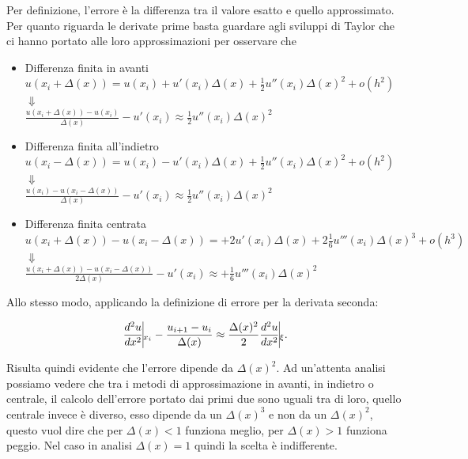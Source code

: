 Per definizione, l'errore è la differenza tra il valore esatto e quello approssimato. Per quanto riguarda le derivate prime basta guardare agli sviluppi di Taylor che ci hanno portato alle loro approssimazioni per osservare che\\
\begin{itemize}
    \item Differenza finita in avanti\\
    \centering
    $u(x_i+\Delta(x))=u(x_i)+u'(x_i)\Delta(x)+\frac{1}{2}u''(x_i)\Delta(x)^2+o(h^2)$ \\ $\Downarrow$\\
    $\frac{u(x_i+\Delta(x))-u(x_i)}{\Delta(x)} -u'(x_i)\approx \frac{1}{2}u''(x_i)\Delta(x)^2$\\
    \raggedright
    \item Differenza finita all'indietro\\
    \centering
    $u(x_i-\Delta(x))=u(x_i)-u'(x_i)\Delta(x)+\frac{1}{2}u''(x_i)\Delta(x)^2+o(h^2)$ \\ $\Downarrow$\\
    $\frac{u(x_i)-u(x_i-\Delta(x))}{\Delta(x)} -u'(x_i)\approx \frac{1}{2}u''(x_i)\Delta(x)^2$\\
    \raggedright
    \item Differenza finita centrata\\
    \centering
    $u(x_i+\Delta(x))-u(x_i-\Delta(x))=+2u'(x_i)\Delta(x)+2\frac{1}{6}u'''(x_i)\Delta(x)^3+o(h^3)$ \\ $\Downarrow$\\
    $\frac{u(x_i+\Delta(x))-u(x_i-\Delta(x))}{2\Delta(x)} -u'(x_i)\approx +\frac{1}{6}u'''(x_i)\Delta(x)^2$\\
    \raggedright
\end{itemize}
\vspace{2em}
Allo stesso modo, applicando la definizione di errore per la derivata seconda:

$$
\frac{d^2u}{dx^2}\vline_{x_i}-\frac{u_{i+1}-u_i}{\Delta(x)}\approx \frac{\Delta(x)^2}{2} \frac{d^2u}{dx^2}\vline_\xi.
$$

Risulta quindi evidente che l'errore dipende da $\Delta(x)^2$. 
Ad un'attenta analisi possiamo vedere che tra i metodi di approssimazione in avanti, in indietro o centrale, il calcolo dell'errore portato dai primi due sono uguali tra di loro, quello centrale invece è diverso, esso dipende da un $\Delta(x)^3$ e non da un $\Delta(x)^2$, questo vuol dire che per $\Delta(x)<1$ funziona meglio, per $\Delta(x)>1$ funziona peggio. Nel caso in analisi $\Delta(x)=1$ quindi la scelta è indifferente.

